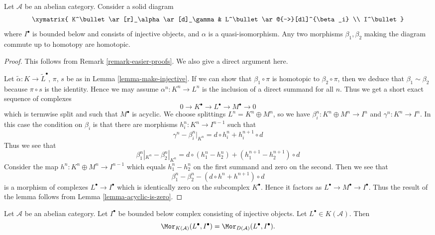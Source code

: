 \begin{lemma}
\label{lemma-morphisms-equal-up-to-homotopy}
Let $\mathcal{A}$ be an abelian category.
Consider a solid diagram
$$
\xymatrix{
K^\bullet \ar[r]_\alpha \ar[d]_\gamma & L^\bullet \ar@{-->}[dl]^{\beta_i} \\
I^\bullet
}
$$
where $I^\bullet$ is bounded below and consists of injective
objects, and $\alpha$ is a quasi-isomorphism.
Any two morphisms $\beta_1, \beta_2$ making the diagram commute
up to homotopy are homotopic.
\end{lemma}

\begin{proof}
This follows from
Remark \ref{remark-easier-proofs}.
We also give a direct argument here.

\medskip\noindent
Let $\tilde \alpha : K \to \tilde L^\bullet$, $\pi$, $s$ be as in
Lemma \ref{lemma-make-injective}. If we can show that $\beta_1 \circ\pi$
is homotopic to $\beta_2 \circ \pi$, then we deduce that
$\beta_1 \sim \beta_2$ because $\pi \circ s$ is the identity.
Hence we may assume $\alpha^n : K^n \to L^n$ is the
inclusion of a direct summand for all $n$. Thus we get a
short exact sequence of complexes
$$
0 \to K^\bullet \to L^\bullet \to M^\bullet \to 0
$$
which is termwise split and such that $M^\bullet$ is acyclic.
We choose splittings $L^n = K^n \oplus M^n$, so we have
$\beta_i^n : K^n \oplus M^n \to I^n$ and $\gamma^n : K^n \to I^n$.
In this case the condition on $\beta_i$ is that there are morphisms
$h_i^n : K^n \to I^{n - 1}$ such that
$$
\gamma^n - \beta_i^n|_{K^n} = d \circ h_i^n + h_i^{n + 1} \circ d
$$
Thus we see that
$$
\beta_1^n|_{K^n} - \beta_2^n|_{K^n}
=
d \circ (h_1^n - h_2^n) + (h_1^{n + 1} - h_2^{n + 1}) \circ d
$$
Consider the map $h^n : K^n \oplus M^n \to I^{n - 1}$ which
equals $h_1^n - h_2^n$ on the first summand and zero on the second.
Then we see that
$$
\beta_1^n - \beta_2^n
-
(d \circ h^n + h^{n + 1}) \circ d
$$
is a morphism of complexes $L^\bullet \to I^\bullet$
which is identically zero on the subcomplex $K^\bullet$.
Hence it factors as $L^\bullet \to M^\bullet \to I^\bullet$.
Thus the result of the lemma follows from Lemma \ref{lemma-acyclic-is-zero}.
\end{proof}

\begin{lemma}
\label{lemma-morphisms-into-injective-complex}
Let $\mathcal{A}$ be an abelian category.
Let $I^\bullet$ be bounded below complex consisting of injective
objects. Let $L^\bullet \in K(\mathcal{A})$. Then
$$
\Mor_{K(\mathcal{A})}(L^\bullet, I^\bullet)
=
\Mor_{D(\mathcal{A})}(L^\bullet, I^\bullet).
$$
\end{lemma}

